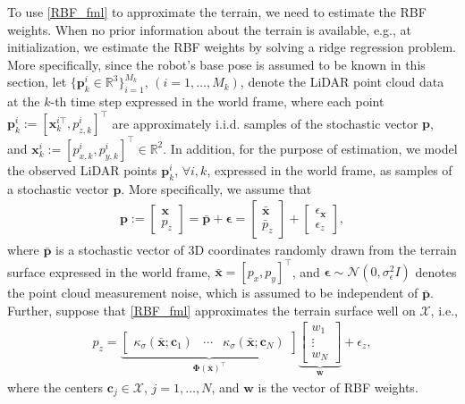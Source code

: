 \documentclass[journal,twoside,web]{ieeecolor}
\newcommand{\mR}{\mathbb{R}}
\begin{document}
To use \eqref{RBF_fml} to approximate the terrain, we need to estimate the RBF weights. 
When no prior information about the terrain is available, e.g., at initialization, we estimate the RBF weights by solving a ridge regression problem.
More specifically, since the robot's base pose is assumed to be known in this section, 
let $\{ \mathbf{p}^i_k \in \mathbb{R}^3 \}_{i=1}^{M_k}$, $(i=1,\ldots,M_k)$, denote the LiDAR point cloud data at the $k$-th time step expressed in the world frame, where each point \( \mathbf{p}^i_k := [\mathbf{x}_k^{i\top}, p_{z,k}^i]^\top\) are approximately i.i.d. samples of the stochastic vector $\mathbf{p}$, and $\mathbf{x}_k^i:=[p_{x,k}^i, p_{y,k}^i]^\top\in\mR^2$.
In addition, for the purpose of estimation, we model the observed LiDAR points $\mathbf{p}_k^i$, $\forall i,k$, expressed in the world frame, as samples of a stochastic vector $\mathbf{p}$. More specifically, we assume that
\begin{align}\label{eq:stochastic_vector}
    \mathbf{p}:=\begin{bmatrix}
        \mathbf{x}\\p_z
    \end{bmatrix}=\bar{\mathbf{p}}+\bm\epsilon=\begin{bmatrix}\bar{\mathbf{x}}\\\bar{p}_{z}\end{bmatrix}+\begin{bmatrix}
        \epsilon_{\mathbf{x}}\\
        \epsilon_z
    \end{bmatrix},
\end{align}
where $\bar{\mathbf{p}}$ is a stochastic vector of 3D coordinates randomly drawn from the terrain surface expressed in the world frame, $\bar{\mathbf{x}}=[p_{x},p_{y}]^\top$, and $\bm\epsilon\sim\mathcal{N}(0,\sigma_\epsilon^2I)$ denotes the point cloud measurement noise, which is assumed to be independent of $\bar{\mathbf{p}}$.
Further, suppose that \eqref{RBF_fml} approximates the terrain surface well on $\mathcal{X}$, i.e.,
\begin{align}\label{eq:fit_height}
    p_z = \underbrace{\begin{bmatrix}
        \kappa_\sigma(\bar{\mathbf{x}};\mathbf{c}_1)&\cdots &\kappa_\sigma(\bar{\mathbf{x}};\mathbf{c}_N)
    \end{bmatrix}}_{\bm{\Phi}(\bar{\mathbf{x}})^\top}
    \underbrace{\begin{bmatrix}
        w_1\\\vdots\\w_N
    \end{bmatrix}}_{\mathbf{w}}+\epsilon_z,
\end{align}
where the centers $\mathbf{c}_j\in\mathcal{X}$, $j=1,\ldots,N$, and $\mathbf{w}$ is the vector of RBF weights.
\end{document}
